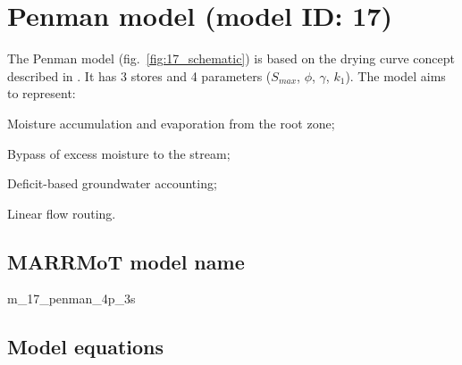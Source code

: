 \section{Penman model (model ID: 17)}
The Penman model (fig.~\ref{fig:17_schematic}) is based on the drying curve concept described in \citet{PENMAN1950} \citep{Wagener2002}. It has 3 stores and 4 parameters ($S_{max}$, $\phi$, $\gamma$, $k_1$). The model aims to represent:

\begin{itemizecompact}
\item Moisture accumulation and evaporation from the root zone;
\item Bypass of excess moisture to the stream;
\item Deficit-based groundwater accounting;
\item Linear flow routing.
\end{itemizecompact}

\subsection{MARRMoT model name}
m\_17\_penman\_4p\_3s \\

\subsection{Model equations}

